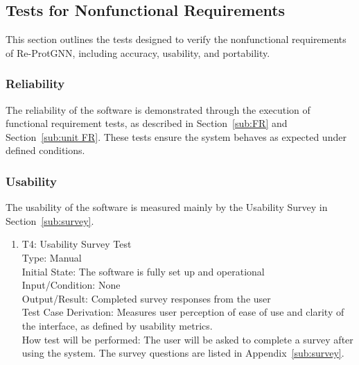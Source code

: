 \documentclass[12pt, titlepage]{article}
\begin{document}
\subsection{Tests for Nonfunctional Requirements}

This section outlines the tests designed to verify the nonfunctional requirements of Re-ProtGNN, including accuracy, usability, and portability.

\subsubsection{Reliability}
		
The reliability of the software is demonstrated through the execution of functional requirement tests, as described in Section~\ref{sub:FR} and Section~\ref{sub:unit FR}. These tests ensure the system behaves as expected under defined conditions.




					
					
					
					


\subsubsection{Usability}

The usability of the software is measured mainly by the Usability Survey in Section~\ref{sub:survey}.

\begin{enumerate}
  \item{T4: Usability Survey Test\\}
  Type: Manual \\
  Initial State: The software is fully set up and operational \\
  Input/Condition: None \\
  Output/Result: Completed survey responses from the user \\
  Test Case Derivation: Measures user perception of ease of use and clarity of the interface, as defined by usability metrics. \\
  How test will be performed: The user will be asked to complete a survey after using the system. The survey questions are listed in Appendix~\ref{sub:survey}.
\end{enumerate}
\end{document}
